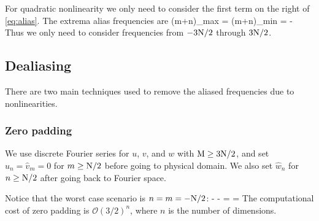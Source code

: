 \documentclass[11pt]{article}
\begin{document}
For quadratic nonlinearity we only need to consider the first term on the right of \eqref{eq:alias}. The extrema alias frequencies are
\beq
(m+n)_{max} = \com\qqand (m+n)_{min} = -\nmax\per
\eeq
Thus we only need to consider frequencies from $-3\mathrm{N}/2$ through $3\mathrm{N}/2$. 

\subsection*{Dealiasing}
There are two main techniques used to remove the aliased frequencies due to nonlinearities. 

\subsubsection*{Zero padding}
We use discrete Fourier series for $u$, $v$, and $w$ with $\mathrm{M}\ge 3\mathrm{N}/2$, and set $\hat{u}_n = \hat{v}_m = 0$ for $m\ge\mathrm{N}/2$ before going to physical domain. We also set $\hat{w}_n$ for $n\ge \mathrm{N}/2$ 
 after going back to Fourier space.

Notice that the worst case scenario is $n=m=-\mathrm{N}/2$:
\beq
- - =  \pm {} \Rightarrow {} = \nmax\per
\eeq
The computational cost of zero padding is $\mathcal{O}(3/2)^n$, where $n$ is the number of dimensions. 
\end{document}
